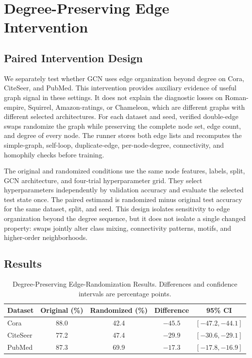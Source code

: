 \section{Degree-Preserving Edge Intervention}
\label{sec:edge_intervention}

\subsection{Paired Intervention Design}

We separately test whether GCN uses edge organization beyond degree on Cora, CiteSeer, and PubMed. This intervention provides auxiliary evidence of useful graph signal in these settings. It does not explain the diagnostic losses on Roman-empire, Squirrel, Amazon-ratings, or Chameleon, which are different graphs with different selected architectures. For each dataset and seed, verified double-edge swaps randomize the graph while preserving the complete node set, edge count, and degree of every node. The runner stores both edge lists and recomputes the simple-graph, self-loop, duplicate-edge, per-node-degree, connectivity, and homophily checks before training.

The original and randomized conditions use the same node features, labels, split, GCN architecture, and four-trial hyperparameter grid. They select hyperparameters independently by validation accuracy and evaluate the selected test state once. The paired estimand is randomized minus original test accuracy for the same dataset, split, and seed. This design isolates sensitivity to edge organization beyond the degree sequence, but it does not isolate a single changed property: swaps jointly alter class mixing, connectivity patterns, motifs, and higher-order neighborhoods.

\subsection{Results}

\begin{table}[t]
\centering
\caption{Degree-Preserving Edge-Randomization Results. Differences and confidence intervals are percentage points.}
\label{tab:degree_intervention}
\small
\begin{tabular}{@{}lcccc@{}}
\toprule
Dataset & Original (\%) & Randomized (\%) & Difference & 95\% CI \\
\midrule
Cora & 88.0 & 42.4 & $-45.5$ & $[-47.2,-44.1]$ \\
CiteSeer & 77.2 & 47.4 & $-29.9$ & $[-30.6,-29.1]$ \\
PubMed & 87.3 & 69.9 & $-17.3$ & $[-17.8,-16.9]$ \\
\bottomrule
\end{tabular}
\end{table}

